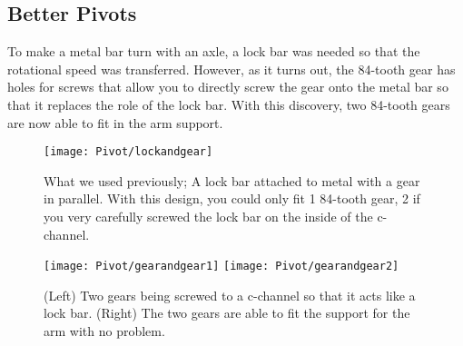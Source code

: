 \subsection{Better Pivots}

To make a metal bar turn with an axle, a lock bar was needed so that the rotational speed was transferred. However, as it turns out, the 84-tooth gear has holes for screws that allow you to directly screw the gear onto the metal bar so that it replaces the role of the lock bar. With this discovery, two 84-tooth gears are now able to fit in the arm support.

\begin{figure}[h]
    \centering
    \texttt{[image: Pivot/lockandgear]}
    \caption{
        What we used previously; A lock bar attached to metal with a gear in parallel. With this design, you could only fit 1 84-tooth gear, 2 if you very carefully screwed the lock bar on the inside of the c-channel.
    }
\end{figure}

\begin{figure}[h]
    \centering
    \texttt{[image: Pivot/gearandgear1]}
    \texttt{[image: Pivot/gearandgear2]}
    \caption{
        (Left) Two gears being screwed to a c-channel so that it acts like a lock bar. (Right) The two gears are able to fit the support for the arm with no problem.
    }
\end{figure}
